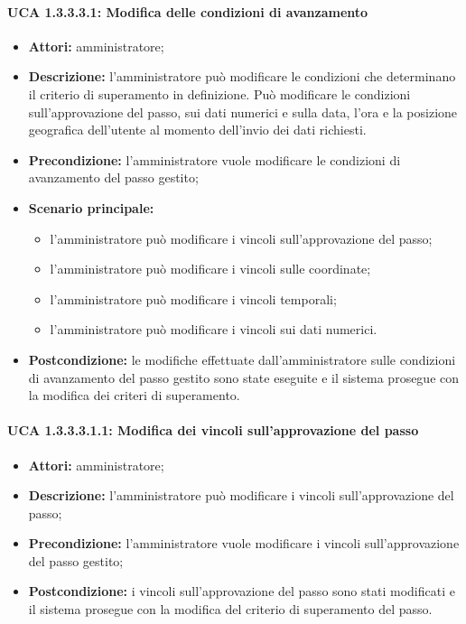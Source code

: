 \paragraph{UCA 1.3.3.3.1: Modifica delle condizioni di avanzamento}
\begin{itemize}
\item \textbf{Attori:} 
amministratore;
\item \textbf{Descrizione:} 
l'amministratore può modificare le condizioni che determinano il criterio di superamento in definizione.
Può modificare le condizioni sull'approvazione del passo, sui dati numerici e sulla data, l'ora e la posizione geografica dell'utente al momento dell'invio dei dati richiesti.
\item \textbf{Precondizione:}
l'amministratore vuole modificare le condizioni di avanzamento del passo gestito;
\item \textbf{Scenario principale:} 
\begin{itemize}
\item l'amministratore può modificare i vincoli sull'approvazione del passo;
\item l'amministratore può modificare i vincoli sulle coordinate;
\item l'amministratore può modificare i vincoli temporali;
\item l'amministratore può modificare i vincoli sui dati numerici.
\end{itemize}
\item \textbf{Postcondizione:}
le modifiche effettuate dall'amministratore sulle condizioni di avanzamento del passo gestito sono state eseguite e il sistema prosegue con la modifica dei criteri di superamento. 
\end{itemize}

\paragraph{UCA 1.3.3.3.1.1: Modifica dei vincoli sull'approvazione del passo}
\begin{itemize}
\item \textbf{Attori:} 
amministratore;
\item \textbf{Descrizione:} 
l'amministratore può modificare i vincoli sull'approvazione del passo;
\item \textbf{Precondizione:} 
l'amministratore vuole modificare i vincoli sull'approvazione del passo gestito;
\item \textbf{Postcondizione:}
i vincoli sull'approvazione del passo sono stati modificati e il sistema prosegue con la modifica del criterio di superamento del passo.
\end{itemize}

